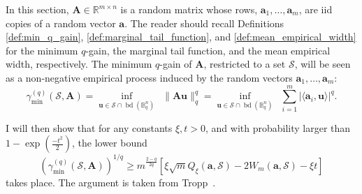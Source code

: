 In this section, $\mathbf{A} \in \mathbb{R}^{m \times n}$ is a random matrix whose rows, $\mathbf{a}_1, \dots, \mathbf{a}_m$, are \acrshort{iid} copies of a random vector $\mathbf{a}$. The reader should recall Definitions \ref{def:min_q_gain}, \ref{def:marginal_tail_function}, and \ref{def:mean_empirical_width} for the minimum $q$-gain, the marginal tail function, and the mean empirical width, respectively. The minimum $q$-gain of $\mathbf{A}$, restricted to a set $\mathcal{S}$, will be seen as a non-negative empirical process induced by the random vectors $\mathbf{a}_1, \dots, \mathbf{a}_m$:
\begin{equation*}
    \gamma_{\min}^{(q)} \left ( \mathcal{S}, \mathbf{A} \right ) = \underset{\mathbf{u} \in \mathcal{S} \cap \operatorname{bd}(\mathbb{B}^{n}_q)}{\inf} \enspace \|\mathbf{A u}\|_q^q = \underset{\mathbf{u} \in \mathcal{S} \cap \operatorname{bd}(\mathbb{B}^{n}_q)}{\inf} \enspace \sum_{i=1}^{m} \left | \langle \mathbf{a}_i, \mathbf{u} \rangle \right |^q.
\end{equation*}

I will then show that for any constants $\xi, t > 0$, and with probability larger than $1 - \exp \left ( \frac{-t^2}{2} \right )$, the lower bound
\begin{equation*}
    \left ( \gamma_{\min}^{(q)} \left ( \mathcal{S}, \mathbf{A} \right ) \right)^{1/q} \geq m^{\frac{2 - q}{2q}} \left [ \xi \sqrt{m} Q_{\xi}(\mathbf{a}, \mathcal{S}) - 2 W_{m}(\mathbf{a}, \mathcal{S}) - \xi t \right ]
\end{equation*}
takes place. The argument is taken from Tropp~\cite[Sec. 2.5.5]{tropp2015a}.

